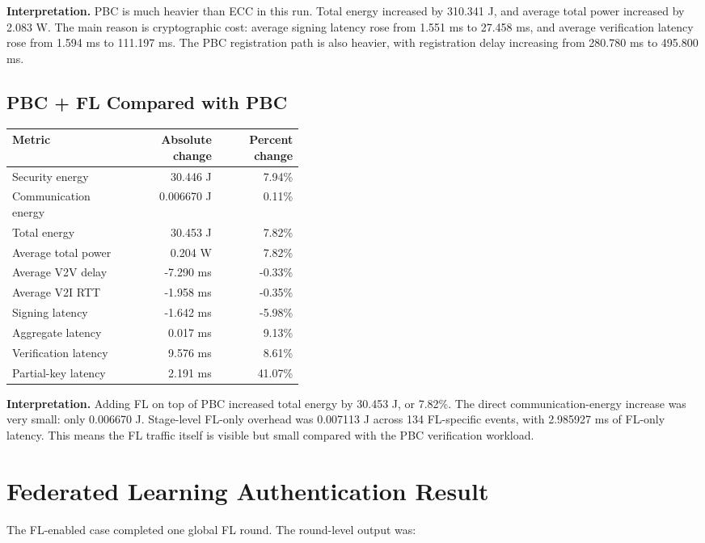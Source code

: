 \documentclass[11pt,a4paper]{article}
\begin{document}
\textbf{Interpretation.} PBC is much heavier than ECC in this run. Total energy
increased by 310.341 J, and average total
power increased by 2.083 W. The main reason is
cryptographic cost: average signing latency rose from 1.551 ms to
27.458 ms, and average verification latency rose from
1.594 ms to 111.197 ms. The PBC
registration path is also heavier, with registration delay increasing from
280.780 ms to 495.800 ms.

\subsection{PBC + FL Compared with PBC}

\begin{longtable}{p{0.42\linewidth}rr}
\toprule
\textbf{Metric} & \textbf{Absolute change} & \textbf{Percent change} \\
\midrule
Security energy & 30.446 J & 7.94\% \\
Communication energy & 0.006670 J & 0.11\% \\
Total energy & 30.453 J & 7.82\% \\
Average total power & 0.204 W & 7.82\% \\
Average V2V delay & -7.290 ms & -0.33\% \\
Average V2I RTT & -1.958 ms & -0.35\% \\
Signing latency & -1.642 ms & -5.98\% \\
Aggregate latency & 0.017 ms & 9.13\% \\
Verification latency & 9.576 ms & 8.61\% \\
Partial-key latency & 2.191 ms & 41.07\% \\
\bottomrule
\end{longtable}

\textbf{Interpretation.} Adding FL on top of PBC increased total energy by
30.453 J, or 7.82\%.
The direct communication-energy increase was very small: only
0.006670 J. Stage-level FL-only overhead was
0.007113 J across 134
FL-specific events, with 2.985927 ms of FL-only latency.
This means the FL traffic itself is visible but small compared with the PBC
verification workload.

\section{Federated Learning Authentication Result}

The FL-enabled case completed one global FL round. The round-level output was:
\end{document}
